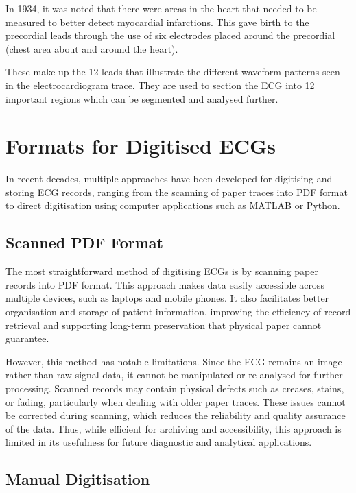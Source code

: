 In 1934, it was noted that there were areas in the heart that needed to be measured to better detect myocardial infarctions. This gave birth to the precordial leads through the use of six electrodes placed around the precordial (chest area about and around the heart). 

These make up the 12 leads that illustrate the different waveform patterns seen in the electrocardiogram trace. They are used to section the ECG into 12 important regions which can be segmented and analysed further. \cite{AlGhatrif2012}


\section{Formats for Digitised ECGs}

In recent decades, multiple approaches have been developed for digitising and storing ECG records, ranging from the scanning of paper traces into PDF format to direct digitisation using computer applications such as MATLAB or Python.

\subsection{Scanned PDF Format}

The most straightforward method of digitising ECGs is by scanning paper records into PDF format. This approach makes data easily accessible across multiple devices, such as laptops and mobile phones. It also facilitates better organisation and storage of patient information, improving the efficiency of record retrieval and supporting long-term preservation that physical paper cannot guarantee.

However, this method has notable limitations. Since the ECG remains an image rather than raw signal data, it cannot be manipulated or re-analysed for further processing. Scanned records may contain physical defects such as creases, stains, or fading, particularly when dealing with older paper traces. These issues cannot be corrected during scanning, which reduces the reliability and quality assurance of the data. Thus, while efficient for archiving and accessibility, this approach is limited in its usefulness for future diagnostic and analytical applications.

\subsection{Manual Digitisation}

